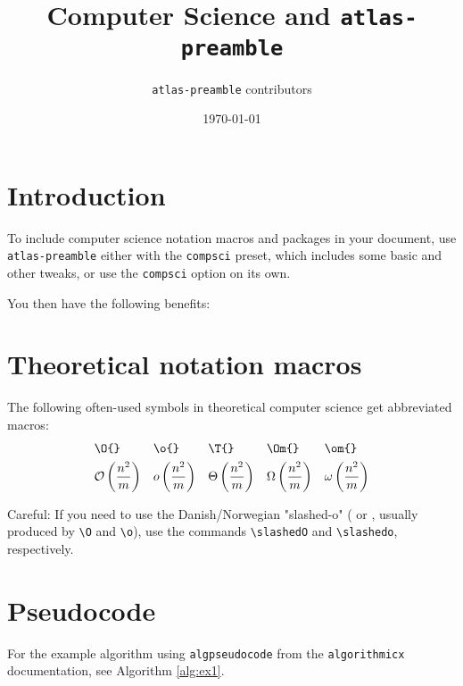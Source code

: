 \documentclass[11pt, a4paper]{article}
\title{Computer Science and \texttt{atlas-preamble}}
\author{\texttt{atlas-preamble} contributors}
\date{\today}
\begin{document}
\maketitle


\section{Introduction}
To include computer science notation macros and packages in your document, use \texttt{atlas-preamble} either with the \texttt{compsci} preset, which includes some basic and other tweaks, or use the \texttt{compsci} option on its own.

\noindent
You then have the following benefits:



\section{Theoretical notation macros}
The following often-used symbols in theoretical computer science get abbreviated macros:
\begin{align*}
	&\texttt{\textbackslash O\{\}} & &\texttt{\textbackslash o\{\}} & &\texttt{\textbackslash T\{\}} & &\texttt{\textbackslash Om\{\}} & &\texttt{\textbackslash om\{\}} \\
	&\mathcal{O}\left(\frac{n^2}{m}\right) & &o\left(\frac{n^2}{m}\right) & &\Theta\left(\frac{n^2}{m}\right) & &\Omega\left(\frac{n^2}{m}\right) & &\omega\left(\frac{n^2}{m}\right)
\end{align*}

\noindent
Careful: If you need to use the Danish/Norwegian "slashed-o" (\slashedO{} or \slashedo{}, usually produced by \texttt{\textbackslash O} and \texttt{\textbackslash o}), use the commands \texttt{\textbackslash slashedO} and \texttt{\textbackslash slashedo}, respectively.



\section{Pseudocode}
For the example algorithm using \texttt{algpseudocode} from the \texttt{algorithmicx} documentation, see Algorithm \ref{alg:ex1}.
\end{document}
